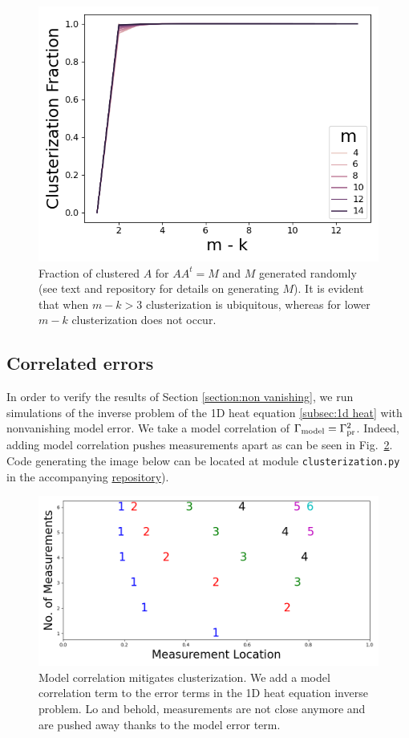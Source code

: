 \begin{figure}
    \centering
    \includegraphics[height=0.5\textwidth]{simulations.png}
    \caption{Fraction of clustered $A$ for $AA^t = M$ and $M$
      generated randomly (see text and repository for details on
      generating $M$). It is evident that when $m-k >3$ clusterization
      is ubiquitous, whereas for lower $m-k$ clusterization does not
      occur.}
  \label{fig:sim AAt}
\end{figure}


\subsection{Correlated errors}\label{subsec:corr errors sims}
In order to verify the results of Section \ref{section:non vanishing},
we run simulations of the inverse problem of the 1D heat equation
\ref{subsec:1d heat} with nonvanishing model error. We take a model
correlation of \(\Gamma_{\textup{model}} = \Gamma_{\textup{pr}}^2 \). Indeed, adding model
correlation pushes measurements apart as can be seen in
Fig.~\ref{fig:corr errors}. Code generating the image below can be
located at module \texttt{clusterization.py} in the accompanying
\href{https://github.com/yairdaon/OED}{repository}).

\begin{figure}
    \centering
    \includegraphics[height=0.5\textwidth]{dst_modelError4.png}
    \caption{Model correlation mitigates clusterization. We add a
      model correlation term to the error terms in the 1D heat
      equation inverse problem. Lo and behold, measurements are not
      close anymore and are pushed away thanks to the model error
      term.}
  \label{fig:corr errors}
\end{figure}


